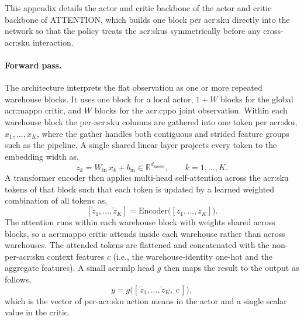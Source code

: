 This appendix details the actor and critic backbone of the actor and critic backbone of ATTENTION, which builds one block per \gls{acr:sku} directly into the network so that the policy treats the \glspl{acr:sku}
symmetrically before any cross-\gls{acr:sku} interaction.

\paragraph{\textbf{Forward pass.}} The architecture interprets the flat
observation as one or more repeated warehouse blocks. It uses one block for a
local actor, $1+W$ blocks for the global \gls{acr:mappo} critic, and $W$ blocks
for the \gls{acr:cppo} joint observation. Within each warehouse block the per-\gls{acr:sku} columns are gathered into one token per \gls{acr:sku}, $x_1,\dots,x_K$, where the gather handles both contiguous and strided feature groups such as the pipeline. A single shared linear layer projects every token to the embedding width as,
\begin{equation}
\label{eq:attn-proj}
  z_k = W_{\mathrm{in}}\,x_k + b_{\mathrm{in}} \in \mathbb{R}^{d_{\mathrm{model}}},
  \qquad k = 1,\dots,K .
\end{equation}
A transformer encoder then applies multi-head self-attention across the
\gls{acr:sku} tokens of that block such that each token is updated by a learned
weighted combination of all tokens as,
\begin{equation}
\label{eq:attn-mhsa}
  [\tilde z_1,\dots,\tilde z_K] = \mathrm{Encoder}\big([z_1,\dots,z_K]\big).
\end{equation}
The attention runs within each warehouse block with weights shared across blocks,
so a \gls{acr:mappo} critic attends inside each warehouse rather than across
warehouses. The attended tokens are flattened and concatenated with the
non-per-\gls{acr:sku} context features $c$ (i.e., the warehouse-identity one-hot and the aggregate features). A small \gls{acr:mlp} head $g$ then maps the result to the output as follows,
\begin{equation}
\label{eq:attn-head}
  y = g\big([\,\tilde z_1,\dots,\tilde z_K,\ c\,]\big),
\end{equation}
which is the vector of per-\gls{acr:sku} action means in the actor and a single
scalar value in the critic.

